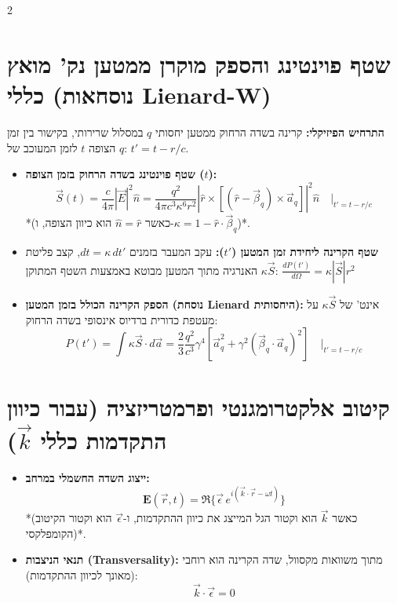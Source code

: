 \documentclass[10pt,a4paper]{article}
\begin{document}
\begin{multicols*}{2}
\section*{שטף פוינטינג והספק מוקרן ממטען נק' מואץ כללי (נוסחאות \textenglish{Lienard-W})}

\textbf{התרחיש הפיזיקלי:} קרינה בשדה הרחוק ממטען יחסותי $q$ במסלול שרירותי, בקישור בין זמן הצופה $t$ לזמן המעוכב של $q$: $t' = t - r/c$.

\begin{itemize}[leftmargin=*]
    \item \textbf{שטף פוינטינג בשדה הרחוק בזמן הצופה ($t$):}
    $$\vec{S}(t) = \frac{c}{4\pi} |\vec{E}|^2 \hat{n} = \frac{q^2}{4\pi c^3 \kappa^6 r^2} \left| \hat{r} \times \left[ (\hat{r} - \vec{\beta}_q) \times \vec{a}_q \right] \right|^2 \hat{n} \quad \Big|_{t'=t-r/c}$$
    *(כאשר $\hat{n} = \hat{r}$ הוא כיוון הצופה, ו-$\kappa = 1 - \hat{r} \cdot \vec{\beta}_q$)*.

    \item \textbf{שטף הקרינה ליחידת זמן המטען ($t'$):}
    עקב המעבר בזמנים $dt = \kappa \, dt'$, קצב פליטת האנרגיה מתוך המטען מבוטא באמצעות השטף המתוקן $\kappa \vec{S}$:
    $\frac{dP(t')}{d\Omega} = \kappa |\vec{S}| r^2$

    \item \textbf{הספק הקרינה הכולל בזמן המטען (נוסחת Lienard היחסותית):}
    אינט' של $\kappa \vec{S}$ על מעטפת כדורית ברדיוס אינסופי בשדה הרחוק:
    $$P(t') = \int \kappa \vec{S} \cdot d\vec{a} = \frac{2}{3} \frac{q^2}{c^3} \gamma^4 \left[ \vec{a}_q^2 + \gamma^2 (\vec{\beta}_q \cdot \vec{a}_q)^2 \right] \quad \Big|_{t'=t-r/c}$$
\end{itemize}

\section*{קיטוב אלקטרומגנטי ופרמטריזציה (עבור כיוון התקדמות כללי $\vec{k}$)}

\begin{itemize}[leftmargin=*]
    \item \textbf{ייצוג השדה החשמלי במרחב:}
    $$\mathbf{E}(\vec{r}, t) = \Re\{\vec{\epsilon} \, e^{i(\vec{k}\cdot\vec{r}-\omega t)}\}$$
    *(כאשר $\vec{k}$ הוא וקטור הגל המייצג את כיוון ההתקדמות, ו-$\vec{\epsilon}$ הוא וקטור הקיטוב הקומפלקסי)*.

    \item \textbf{תנאי הניצבות (Transversality):} 
    מתוך משוואות מקסוול, שדה הקרינה הוא רוחבי (מאונך לכיוון ההתקדמות):
    $$\vec{k} \cdot \vec{\epsilon} = 0$$


\end{itemize}
\end{multicols*}
\end{document}
